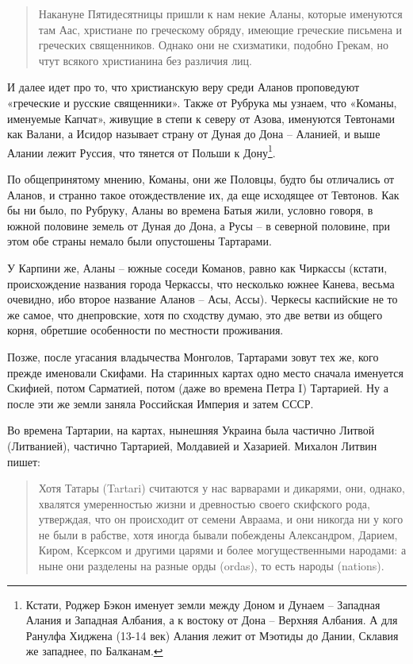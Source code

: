 \begin{quotation}
Накануне Пятидесятницы пришли к нам некие Аланы, которые именуются там Аас, христиане по греческому обряду, имеющие греческие письмена и греческих священников. Однако они не схизматики, подобно Грекам, но чтут всякого христианина без различия лиц.
\end{quotation}

И далее идет про то, что христианскую веру среди Аланов проповедуют «греческие и русские священники». Также от Рубрука мы узнаем, что «Команы, именуемые Капчат», живущие в степи к северу от Азова, именуются Тевтонами как Валани, а Исидор называет страну от Дуная до Дона – Аланией, и выше Алании лежит Руссия, что тянется от Польши к Дону\footnote{Кстати, Роджер Бэкон именует земли между Доном и Дунаем – Западная Алания и Западная Албания, а к востоку от Дона – Верхняя Албания. А для Ранулфа Хиджена (13-14 век) Алания лежит от Мэотиды до Дании, Склавия же западнее, по Балканам.}. 

По общепринятому мнению, Команы, они же Половцы, будто бы отличались от Аланов, и странно такое отождествление их, да еще исходящее от Тевтонов. Как бы ни было, по Рубруку, Аланы во времена Батыя жили, условно говоря, в южной половине земель от Дуная до Дона, а Русы – в северной половине, при этом обе страны немало были опустошены Тартарами.

У Карпини же, Аланы – южные соседи Команов, равно как Чиркассы (кстати, происхождение названия города Черкассы, что несколько южнее Канева, весьма очевидно, ибо второе название Аланов – Асы, Ассы). Черкесы каспийские не то же самое, что днепровские, хотя по сходству думаю, это две ветви из общего корня, обретшие особенности по местности проживания.

Позже, после угасания владычества Монголов, Тартарами зовут тех же, кого прежде именовали Скифами. На старинных картах одно место сначала именуется Скифией, потом Сарматией, потом (даже во времена Петра I) Тартарией. Ну а после эти же земли заняла Российская Империя и затем СССР.

Во времена Тартарии, на картах, нынешняя Украина была частично Литвой (Литванией), частично Тартарией, Молдавией и Хазарией. Михалон Литвин пишет:

\begin{quotation}
Хотя Татары (Tartari) считаются у нас варварами и дикарями, они, однако, хвалятся умеренностью жизни и древностью своего скифского рода, утверждая, что он происходит от семени Авраама, и они никогда ни у кого не были в рабстве, хотя иногда бывали побеждены Александром, Дарием, Киром, Ксерксом и другими царями и более могущественными народами: а ныне они разделены на разные орды (ordas), то есть народы (nations).  
\end{quotation}

